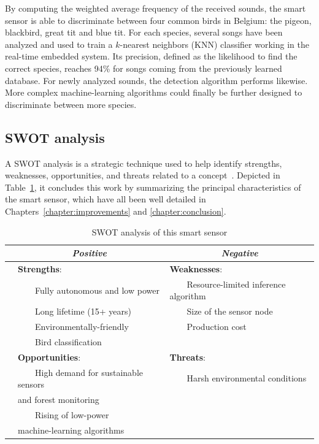 \documentclass{EPL-master-thesis-covers-EN}
\newcommand{\tabitem}{~~\llap{\textbullet}~~}
\begin{document}
By computing the weighted average frequency of the received sounds, the smart sensor is able to discriminate between four common birds in Belgium: the pigeon, blackbird, great tit and blue tit. For each species, several songs have been analyzed and used to train a $k$-nearest neighbors (KNN) classifier working in the real-time embedded system. Its precision, defined as the likelihood to find the correct species, reaches 94\% for songs coming from the previously learned database. For newly analyzed sounds, the detection algorithm performs likewise. More complex machine-learning algorithms could finally be further designed to discriminate between more species.


\subsection*{SWOT analysis}

A SWOT analysis is a strategic technique used to help  identify strengths, weaknesses, opportunities, and threats related to a concept~\cite{HILL199746}. Depicted in Table~\ref{tab:SWOT}, it concludes this work by summarizing the principal characteristics of the smart sensor, which have all been well detailed in Chapters~\ref{chapter:improvements} and \ref{chapter:conclusion}.

\begin{table}[H]
\centering
 \begin{tabular}{p{}|p{}|p{}}
 & \multicolumn{1}{c|}{\textit{Positive}} & \multicolumn{1}{c}{\textit{Negative}} \\ \midrule
 \parbox[t]{3mm}{} 
 & \textbf{Strengths}: & \textbf{Weaknesses}:\\
 & \tabitem Fully autonomous and low power & \tabitem Resource-limited inference algorithm\\
 & \tabitem Long lifetime (15+ years) & \tabitem Size of the sensor node\\
 & \tabitem Environmentally-friendly & \tabitem Production cost\\
 & \tabitem Bird classification & \\
 \midrule
\parbox[t]{3mm}{}
 & \textbf{Opportunities}: & \textbf{Threats}:\\
 & \tabitem High demand for sustainable sensors & \tabitem Harsh environmental conditions\\
 & \hspace{4mm} and forest monitoring & \\
 & \tabitem Rising of low-power & \\
 & \hspace{4mm} machine-learning algorithms & \\
 \end{tabular}
\caption{SWOT analysis of this smart sensor}
\label{tab:SWOT}
\end{table}
\end{document}
